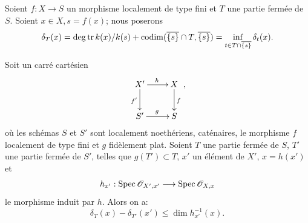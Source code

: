 \subsection{} \label{XIV.2.2} Soient $f:X\to S$ un morphisme localement de type fini et $T$ une partie ferm\'ee de $S$. Soient $x\in X, s=f(x)$; nous poserons
$$
\delta_T(x)=\operatorname{deg\,tr} k(x)/k(s)+\operatorname{codim}(\overline{\{s\}}\cap T, \overline{\{s\}})=\inf_{t\in T\cap\overline{\{s\}}}\delta_t(x).
$$

\begin{sublemme} \label{XIV.2.2.1}
Soit un carr\'e cart\'esien
$$
\xymatrix{X^{\prime}\ar[r]^{h}\ar[d]_{f^{\prime}}&X\ar[d]^f\\S^{\prime}\ar[r]^g&S},
$$
o\`u les sch\'emas $S$ et $S'$ sont localement noeth\'eriens, cat\'enaires, le morphisme $f$ localement de type fini et $g$ fid\`element plat. Soient $T$ une partie ferm\'ee de $S$, $T'$ une partie ferm\'ee de $S'$, telles que $g(T')\subset T$, $x'$ un \'el\'ement de $X'$, $x=h(x')$ et
$$h_{x'}:\Spec\Oo_{X', x'}\to\Spec\Oo_{X, x}$$
le morphisme induit par $h$. Alors on a:
$$
\delta_T(x)-\delta_{T'}(x')\leq\dim h_{x'}^{-1}(x).
$$
\end{sublemme}

